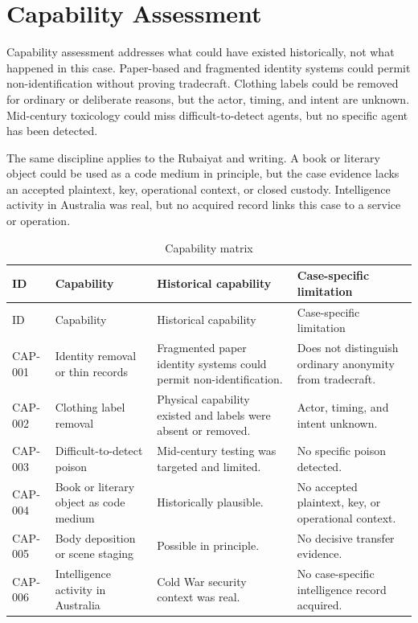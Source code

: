 \section{Capability Assessment}

Capability assessment addresses what could have existed historically, not what happened in this case. Paper-based and fragmented identity systems could permit non-identification without proving tradecraft. Clothing labels could be removed for ordinary or deliberate reasons, but the actor, timing, and intent are unknown. Mid-century toxicology could miss difficult-to-detect agents, but no specific agent has been detected.

The same discipline applies to the Rubaiyat and writing. A book or literary object could be used as a code medium in principle, but the case evidence lacks an accepted plaintext, key, operational context, or closed custody. Intelligence activity in Australia was real, but no acquired record links this case to a service or operation.

\begingroup
\scriptsize
\setlength{\tabcolsep}{2pt}
\renewcommand{\arraystretch}{1.12}
\begin{longtable}{>{\raggedright\arraybackslash}p{}>{\raggedright\arraybackslash}p{}>{\raggedright\arraybackslash}p{}>{\raggedright\arraybackslash}p{}}
\caption{Capability matrix}\label{tab:chapter10-capability-matrix}\\
\toprule
ID & Capability & Historical capability & Case-specific limitation \\
\midrule
\endfirsthead
\toprule
ID & Capability & Historical capability & Case-specific limitation \\
\midrule
\endhead
CAP-001 & Identity removal or thin records & Fragmented paper identity systems could permit non-identification. & Does not distinguish ordinary anonymity from tradecraft. \\
CAP-002 & Clothing label removal & Physical capability existed and labels were absent or removed. & Actor, timing, and intent unknown. \\
CAP-003 & Difficult-to-detect poison & Mid-century testing was targeted and limited. & No specific poison detected. \\
CAP-004 & Book or literary object as code medium & Historically plausible. & No accepted plaintext, key, or operational context. \\
CAP-005 & Body deposition or scene staging & Possible in principle. & No decisive transfer evidence. \\
CAP-006 & Intelligence activity in Australia & Cold War security context was real. & No case-specific intelligence record acquired. \\
\bottomrule
\end{longtable}
\endgroup

